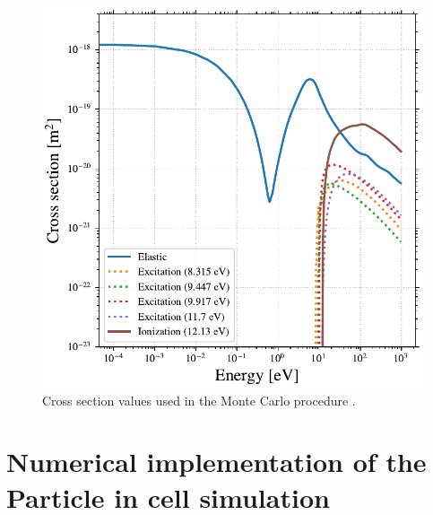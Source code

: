     \begin{figure}[hbtp]
      \centering
      \includegraphics[width=\defaultwidth]{figure/xenon_cross_section.pdf}
      \caption{Cross section values used in the Monte Carlo procedure \cite{Lxcat_Xe,Lxcat_Xe2}.}
      \label{fig-xexsection}
    \end{figure}


\section{Numerical implementation of the Particle in cell simulation}

